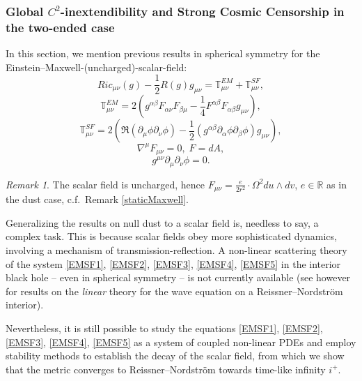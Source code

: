 \documentclass[10pt,a4paper]{article}
\theoremstyle{plain}
\theoremstyle{remark}
\newtheorem{rmk}{Remark}[section]
\theoremstyle{definition}
\newcommand{\RR}{\mathbb{R}}
\theoremstyle{plain}
\theoremstyle{remark}
\theoremstyle{definition}
\numberwithin{equation}{section}
\begin{document}
\subsubsection{Global $C^2$-inextendibility and Strong Cosmic Censorship in the two-ended case}   \label{unchargedsection}
In this section, we mention previous results in spherical symmetry for the Einstein--Maxwell-(uncharged)-scalar-field:  \begin{equation} \label{EMSF1} Ric_{\mu \nu}(g)- \frac{1}{2}R(g)g_{\mu \nu}= \mathbb{T}^{EM}_{\mu \nu}+  \mathbb{T}^{SF}_{\mu \nu} ,    \end{equation} 
\begin{equation}\label{EMSF2} \mathbb{T}^{EM}_{\mu \nu}=2\left(g^{\alpha \beta}F _{\alpha \nu}F_{\beta \mu }-\frac{1}{4}F^{\alpha \beta}F_{\alpha \beta}g_{\mu \nu}\right),
\end{equation} \begin{equation} \label{EMSF3} \mathbb{T}^{SF}_{\mu \nu}= 2\left( \Re(\partial_{\mu}\phi \partial_{\nu}\phi) -\frac{1}{2}(g^{\alpha \beta} \partial_{\alpha}\phi \partial_{\beta}\phi  )g_{\mu \nu} \right), \end{equation} \begin{equation} \label{EMSF4} \nabla^{\mu} F_{\mu \nu}=0, \; F=dA , \end{equation} \begin{equation} \label{EMSF5}  g^{\mu \nu} \partial_{\mu} \partial_{\nu}\phi =0.
\end{equation} \begin{rmk} \label{staticMaxwell2}
	The scalar field is uncharged, hence $F_{\mu \nu}=  \frac{e}{2r^2}  \cdot \Omega^2 du \wedge dv $, $e\in \RR$ as in the dust case, c.f.\ Remark \ref{staticMaxwell}.
\end{rmk}

Generalizing the results on null dust to a scalar field is, needless to say, a complex task. This is because scalar fields obey more sophisticated dynamics, involving a mechanism of transmission-reflection. A non-linear scattering theory of the system \eqref{EMSF1}, \eqref{EMSF2}, \eqref{EMSF3}, \eqref{EMSF4}, \eqref{EMSF5} in the interior black hole -- even in spherical symmetry -- is not currently available (see however \cite{ChristophYakov} for results on the \textit{linear} theory for the wave equation on a Reissner--Nordstr\"{o}m interior).

Nevertheless, it is still possible to study the equations \eqref{EMSF1}, \eqref{EMSF2}, \eqref{EMSF3}, \eqref{EMSF4}, \eqref{EMSF5} as a system of coupled non-linear PDEs and employ stability methods to establish the decay of the scalar field, from which we show that the metric converges to Reissner--Nordstr\"{o}m towards time-like infinity $i^+$. 
\end{document}
